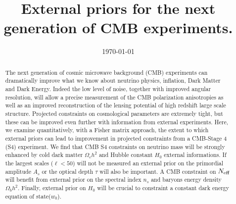 \documentclass[aps,prd,reprint,superscriptaddress]{revtex4-1}
\begin{document}
\graphicspath{{images/}}

\title{External priors for the next generation of CMB experiments.}
%
%

\date{\today}
\begin{abstract}
The next generation of cosmic microwave background (CMB) experiments can dramatically improve what we know about neutrino physics, inflation, Dark Matter and Dark Energy. 
Indeed the low level of noise, together with improved angular resolution, will allow a precise measurement of the CMB polarization anisotropies as well as an improved reconstruction of the lensing potential of high redshift large scale structure. 
Projected constraints on cosmological parameters are extremely tight, but these can be improved even further with information from external experiments. Here, we examine quantitatively, with a Fisher matrix approach, the extent to which external priors can lead to improvement in projected constraints from a CMB-Stage 4 (S4) experiment.
We find that CMB S4 constraints on neutrino mass will be strongly enhanced by cold dark matter $\Omega_{c}h^{2}$ and Hubble constant $H_{0}$ external informations. If the largest scales ($\ell<50$) will not be measured an external prior on the primordial amplitude $A_{s}$ or the optical depth $\tau$ will also be important. A CMB constraint on $N_{\rm eff}$ will benefit from external prior on the spectral index $n_{s}$ and baryons energy density $\Omega_{b}h^{2}$. Finally, external prior on $H_{0}$ will be crucial to constraint a constant dark energy equation of state($w_{0}$).
\end{abstract}

\pacs{}
\maketitle
\end{document}
